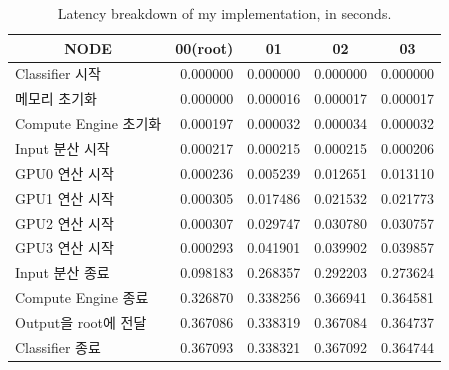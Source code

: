 \begin{table}[]
    \centering
    \begin{tabular}{l|rrrr}
    \multicolumn{1}{c|}{NODE} & \multicolumn{1}{c}{00(root)} & \multicolumn{1}{c}{01} & \multicolumn{1}{c}{02} & \multicolumn{1}{c}{03} \\ \hline
    Classifier 시작           & 0.000000               & 0.000000               & 0.000000               & 0.000000               \\
    메모리 초기화              & 0.000000               & 0.000016               & 0.000017               & 0.000017               \\
    Compute Engine 초기화     & 0.000197               & 0.000032               & 0.000034               & 0.000032               \\
    Input 분산 시작            & 0.000217               & 0.000215               & 0.000215               & 0.000206               \\
    GPU0 연산 시작             & 0.000236               & 0.005239               & 0.012651               & 0.013110               \\
    GPU1 연산 시작             & 0.000305               & 0.017486               & 0.021532               & 0.021773               \\
    GPU2 연산 시작             & 0.000307               & 0.029747               & 0.030780               & 0.030757               \\
    GPU3 연산 시작             & 0.000293               & 0.041901               & 0.039902               & 0.039857               \\
    Input 분산 종료            & 0.098183               & 0.268357               & 0.292203               & 0.273624               \\
    Compute Engine 종료       & 0.326870               & 0.338256               & 0.366941               & 0.364581               \\
    Output을 root에 전달       & 0.367086               & 0.338319               & 0.367084               & 0.364737               \\
    Classifier 종료           & 0.367093               & 0.338321               & 0.367092               & 0.364744              
    \end{tabular}
    \caption{Latency breakdown of my implementation, in seconds.}
    \label{tab:latency_breakdown}
\end{table}

